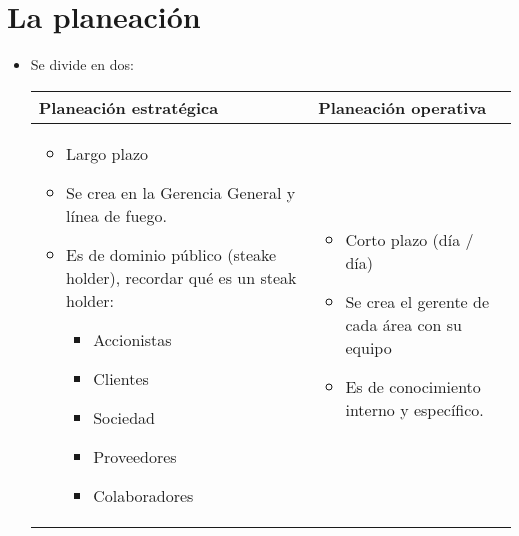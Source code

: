 \section{La planeación}
\begin{itemize}
    \item Se divide en dos:
        \begin{center}
           \begin{tabular}{ | p{7cm} | p{7cm} }
               \hline
                   Planeación estratégica & Planeación operativa     \\
               \hline
                    \begin{itemize}
                        \item Largo plazo 
                        \item Se crea en la Gerencia General y línea de fuego.
                        \item Es de dominio público (steake holder), recordar qué es un steak holder:
                            \begin{itemize}[label=\#]
                                \item Accionistas 
                                \item Clientes 
                                \item Sociedad 
                                \item Proveedores 
                                \item Colaboradores
                            \end{itemize}
                    \end{itemize}
                    & 
                    \begin{itemize}
                        \item Corto plazo (día / día) 
                        \item Se crea el gerente de cada área con su equipo
                        \item Es de conocimiento interno y específico.
                    \end{itemize}
                    \\ 
                \hline
           \end{tabular}
        \end{center}
\end{itemize}



